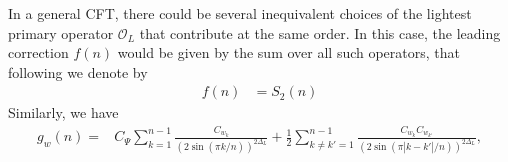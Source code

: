 \documentclass[11pt]{article}
\newcommand{\mO}{\mathcal{O}}
\newcommand{\nn}{\nonumber}
\begin{document}
  In a general CFT, there could be several inequivalent choices of the lightest primary
  operator $\mO_{L}$ that contribute at the same order. In this case, the leading
  correction $f(n)$ would be given by the sum over all such operators, that
  following \cite{calabrese2011entanglement} we denote by
  \begin{align}
    f(n) & =S_{2}(n)
  \end{align}
  Similarly, we have
  \begin{align}\label{gnw}
    g_{w}(n)= & C_{\Psi}\sum_{k=1}^{n-1}\frac{C_{w_k}}{(2\sin(\pi k/n))^{2\Delta_L}}+\frac{1}{2}\sum_{k\neq k'=1}^{n-1}\frac{C_{w_k}C_{w_{k'}}}{(2\sin(\pi |k-k'|/n))^{2\Delta_L}}, %
  \end{align}
\end{document}
